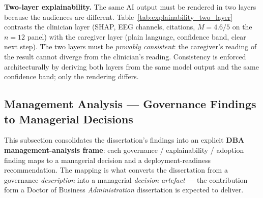 

\noindent\textbf{Two-layer explainability.} The same AI output must be rendered in two layers because the audiences are different. Table~\ref{tab:explainability_two_layer} contrasts the clinician layer (SHAP, EEG channels, citations, $M = 4.6/5$ on the $n = 12$ panel) with the caregiver layer (plain language, confidence band, clear next step). The two layers must be \emph{provably consistent}: the caregiver's reading of the result cannot diverge from the clinician's reading. Consistency is enforced architecturally by deriving both layers from the same model output and the same confidence band; only the rendering differs.



\subsection{Management Analysis --- Governance Findings to Managerial Decisions}
\label{sec:management_analysis}

This subsection consolidates the dissertation's findings into an explicit \textbf{DBA management-analysis frame}: each governance / explainability / adoption finding maps to a managerial decision and a deployment-readiness recommendation. The mapping is what converts the dissertation from a governance \emph{description} into a managerial \emph{decision artefact} — the contribution form a Doctor of Business \emph{Administration} dissertation is expected to deliver.

